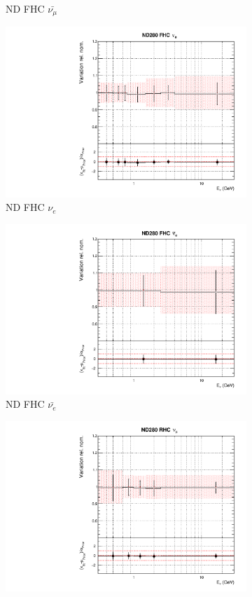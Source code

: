 \begin{figure}[!htbp]
\begin{subfigure}{0.45\textwidth}
  \caption{ND FHC $\bar{\nu_{\mu}}$}
\end{subfigure}
\begin{subfigure}{0.45\textwidth}
  \centering
  \includegraphics[width=0.75\linewidth]{figs/asmvfluxpoly2}
  \caption{ND FHC $\nu_e$}
\end{subfigure}
\begin{subfigure}{0.45\textwidth}
  \centering
  \includegraphics[width=0.75\linewidth]{figs/asmvfluxpoly3}
  \caption{ND FHC $\bar{\nu_{e}}$}
\end{subfigure}
\begin{subfigure}{0.45\textwidth}
  \centering
  \includegraphics[width=0.75\linewidth]{figs/asmvfluxpoly4}

\end{subfigure}
\end{figure}
